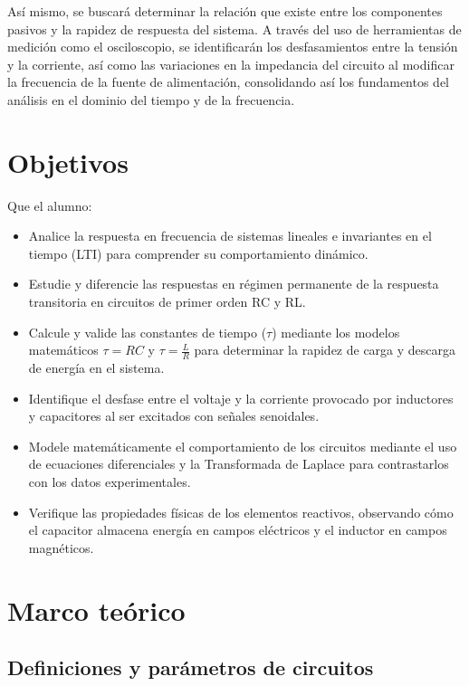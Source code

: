 \documentclass[letter,11pt]{article}
\begin{document}
	\hspace{0.5cm}Así mismo, se buscará determinar la relación que existe entre los componentes pasivos y la rapidez de respuesta del sistema. 
	A través del uso de herramientas de medición como el osciloscopio, se identificarán los desfasamientos entre la tensión y la corriente, así como las variaciones en la impedancia del circuito al modificar la frecuencia de la fuente de alimentación, consolidando así los fundamentos del análisis en el dominio del tiempo y de la frecuencia.
	
\section{Objetivos}
	
	Que el alumno: 
	
	\begin{itemize}
		\item Analice la respuesta en frecuencia de sistemas lineales e invariantes en el tiempo (LTI) para comprender su comportamiento dinámico.
		\item Estudie y diferencie las respuestas en régimen permanente de la respuesta transitoria en circuitos de primer orden RC y RL.
		\item Calcule y valide las constantes de tiempo ($\tau$) mediante los modelos matemáticos $\tau=RC$ y $\tau=\frac{L}{R}$ para determinar la rapidez de carga y descarga de energía en el sistema.
		\item Identifique el desfase entre el voltaje y la corriente provocado por inductores y capacitores al ser excitados con señales senoidales.
		\item Modele matemáticamente el comportamiento de los circuitos mediante el uso de ecuaciones diferenciales y la Transformada de Laplace para contrastarlos con los datos experimentales.
		\item Verifique las propiedades físicas de los elementos reactivos, observando cómo el capacitor almacena energía en campos eléctricos y el inductor en campos magnéticos.
	\end{itemize}
	
\section{Marco teórico}
	
	\subsection{Definiciones y parámetros de circuitos}
	
\end{document}
